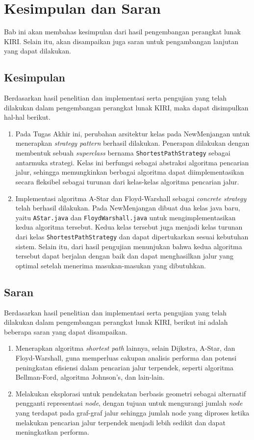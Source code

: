 \chapter{Kesimpulan dan Saran}
\label{chap:kesimpulandansaran}
Bab ini akan membahas kesimpulan dari hasil pengembangan perangkat lunak KIRI. Selain itu, akan disampaikan juga saran untuk pengambangan lanjutan yang dapat dilakukan.
\section{Kesimpulan}
Berdasarkan hasil penelitian dan implementasi serta pengujian yang telah dilakukan dalam pengembangan perangkat lunak KIRI, maka dapat disimpulkan hal-hal berikut.
\begin{enumerate}
    \item Pada Tugas Akhir ini, perubahan arsitektur kelas pada NewMenjangan untuk menerapkan \textit{strategy pattern} berhasil dilakukan. Penerapan dilakukan dengan membentuk sebuah \textit{superclass} bernama \texttt{ShortestPathStrategy} sebagai antarmuka strategi. Kelas ini berfungsi sebagai abstraksi algoritma pencarian jalur, sehingga memungkinkan berbagai algoritma dapat diimplementasikan secara fleksibel sebagai turunan dari kelas-kelas algoritma pencarian jalur.
    \item Implementasi algoritma A-Star dan Floyd-Warshall sebagai \textit{concrete strategy} telah berhasil dilakukan. Pada NewMenjangan dibuat dua kelas java baru, yaitu \texttt{AStar.java} dan \texttt{FloydWarshall.java} untuk mengimplementasikan kedua algoritma tersebut. Kedua kelas tersebut juga menjadi kelas turunan dari kelas \texttt{ShortestPathStrategy} dan dapat dipertukarkan sesuai kebutuhan sistem. Selain itu, dari hasil pengujian menunjukan bahwa kedua algoritma tersebut dapat berjalan dengan baik dan dapat menghasilkan jalur yang optimal setelah menerima masukan-masukan yang dibutuhkan.
\end{enumerate}

\section{Saran}
Berdasarkan hasil penelitian dan implementasi serta pengujian yang telah dilakukan dalam pengembangan perangkat lunak KIRI, berikut ini adalah beberapa saran yang dapat disampaikan.
\begin{enumerate}
    \item Menerapkan algoritma \textit{shortest path} lainnya, selain Dijkstra, A-Star, dan Floyd-Warshall, guna memperluas cakupan analisis performa dan potensi peningkatan efisiensi dalam pencarian jalur terpendek, seperti algoritma Bellman-Ford, algoritma Johnson's, dan lain-lain.
    \item Melakukan eksplorasi untuk pendekatan berbasis geometri sebagai alternatif pengganti representasi \textit{node}, dengan tujuan untuk mengurangi jumlah \textit{node} yang terdapat pada graf-graf jalur sehingga jumlah node yang diproses ketika melakukan pencarian jalur terpendek menjadi lebih sedikit dan  dapat meningkatkan performa.
\end{enumerate}